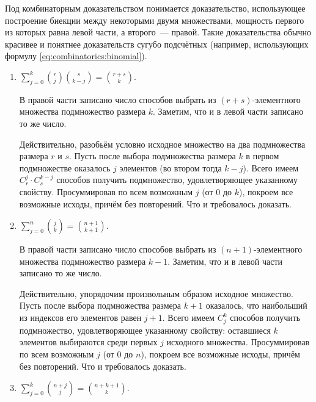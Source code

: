 \begin{Answer}
    \noindent
    Под комбинаторным доказательством понимается доказательство, использующее построение биекции
    между некоторыми двумя множествами, мощность первого из которых равна левой части, а второго~--- правой.
    Такие доказательства обычно красивее и понятнее доказательств сугубо подсчётных
    (например, использующих формулу \eqref{eq:combinatorics:binomial}).
    \begin{enumerate}
        \item
            $ \displaystyle \sum_{j=0}^k \binom{r}{j} \binom{s}{k-j} = \binom{r + s}{k} $.

            В правой части записано число способов выбрать из $ (r + s) $-элементного множества подмножество размера $ k $.
            Заметим, что и в левой части записано то же число.

            Действительно, разобьём условно исходное множество на два подмножества размера $ r $ и $ s $.
            Пусть после выбора подмножества размера $ k $ в первом подмножестве оказалось $ j $ элементов (во втором тогда $ k - j $).
            Всего имеем $ C_r^j \cdot C_s^{k-j} $ способов получить подмножество, удовлетворяющее указанному свойству.
            Просуммировав по всем возможным $ j $ (от $ 0 $ до $ k $), покроем все возможные исходы, причём без повторений.
            Что и требовалось доказать.
        \item
            $ \displaystyle \sum_{j=0}^n \binom{j}{k} = \binom{n+1}{k+1} $.

            В правой части записано число способов выбрать из $ (n+1) $-элементного множества подмножество размера $ k - 1 $.
            Заметим, что и в левой части записано то же число.

            Действительно, упорядочим произвольным образом исходное множество.
            Пусть после выбора подмножества размера $ k + 1 $ оказалось, что наибольший из индексов его элементов равен $ j + 1 $.
            Всего имеем $ C_j^k $ способов получить подмножество, удовлетворяющее указанному свойству:
            оставшиеся $ k $ элементов выбираются среди первых $ j $ исходного множества.
            Просуммировав по всем возможным $ j $ (от $ 0 $ до $ n $), покроем все возможные исходы, причём без повторений.
            Что и требовалось доказать.

        \item
            $ \displaystyle \sum_{j=0}^k \binom{n + j}{j} = \binom{n + k + 1}{k} $.


\end{enumerate}
\end{Answer}
